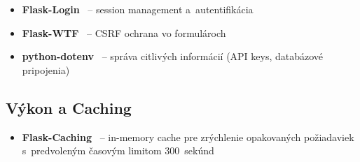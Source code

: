 \begin{itemize}
  \item \textbf{Flask-Login}~\cite{flask_login} -- session management a~autentifikácia
  \item \textbf{Flask-WTF}~\cite{flask_wtf} -- CSRF ochrana vo formulároch
  \item \textbf{python-dotenv}~\cite{python_dotenv} -- správa citlivých informácií (API keys, databázové pripojenia)
\end{itemize}

\subsection{Výkon a Caching}

\begin{itemize}
  \item \textbf{Flask-Caching}~\cite{flask_caching} -- in-memory cache pre zrýchlenie opakovaných požiadaviek
        s~predvoleným časovým limitom 300~sekúnd
\end{itemize}
